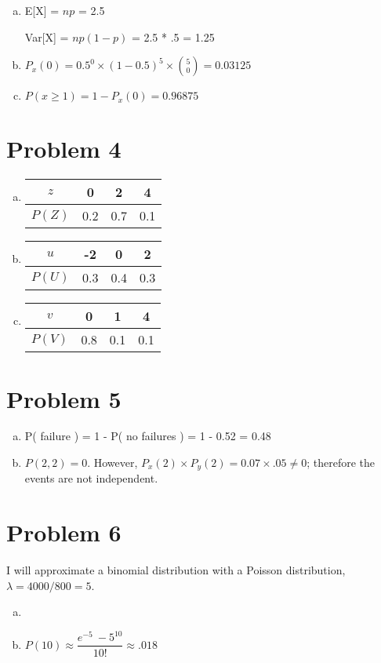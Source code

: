 \documentclass[11pt]{article}
\begin{document}
\begin{enumerate}[(a)]
	\item E[X] = $np$ = 2.5
	
			Var[X] = $np(1-p)$ = 2.5 * .5 = 1.25
	\item $P_x(0) = 0.5^0 \times (1-0.5)^5 \times \binom{5}{0}	 = 0.03125$
	
	\item $P( x \geq 1  ) = 1 - P_x(0) = 0.96875$
	
\end{enumerate}

\section*{Problem 4}

\begin{enumerate}[(a)]
	\item 
		\begin{tabular}{ |c || c | c | c|}
			\hline
			$z$ & 0 & 2 & 4 \\
			\hline
			$P(Z)$ & 0.2 & 0.7 & 0.1 \\
			\hline
		\end{tabular}
		
	\item 
		\begin{tabular}{ |c || c | c | c|}
			\hline
			$u$ & -2 & 0 & 2 \\
			\hline
			$P(U)$ & 0.3 & 0.4 & 0.3 \\
			\hline
		\end{tabular}
		
	\item 
		\begin{tabular}{ |c || c | c | c|}
			\hline
			$v$ & 0 & 1 & 4 \\
			\hline
			$P(V)$ & 0.8 & 0.1 & 0.1 \\
			\hline
		\end{tabular}
\end{enumerate}


\section*{Problem 5}

\begin{enumerate}[(a)]
	\item P( failure ) = 1 - P( no failures ) = 1 - 0.52 = 0.48
	\item $P(2, 2) = 0$. However, $P_x(2) \times P_y(2) = 0.07 \times .05 \neq 0$; therefore the events are not independent.
\end{enumerate}


\section*{Problem 6}
I will approximate a binomial distribution with a Poisson distribution, $\lambda = 4000/800 = 5$.

\begin{enumerate}[(a)]
	\item 
	\item $P(10) \approx \dfrac{e^{-5}\ -5^{10}}{10!} \approx .018$
\end{enumerate}
\end{document}

